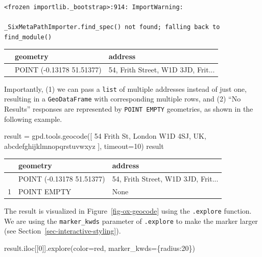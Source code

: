 \documentclass[
  letterpaper,
]{krantz}
\newenvironment{Shaded}{\begin{snugshade}}{\end{snugshade}}
\newcommand{\DecValTok}[1]{\textcolor[rgb]{0.68,0.00,0.00}{#1}}
\newcommand{\NormalTok}[1]{\textcolor[rgb]{0.00,0.23,0.31}{#1}}
\newcommand{\OperatorTok}[1]{\textcolor[rgb]{0.37,0.37,0.37}{#1}}
\newcommand{\StringTok}[1]{\textcolor[rgb]{0.13,0.47,0.30}{#1}}
\begin{document}
\begin{verbatim}
<frozen importlib._bootstrap>:914: ImportWarning:

_SixMetaPathImporter.find_spec() not found; falling back to find_module()
\end{verbatim}

\begin{longtable}[]{@{}lll@{}}
\toprule\noalign{}
& geometry & address \\
\midrule\noalign{}
\endhead
\bottomrule\noalign{}
\endlastfoot
0 & POINT (-0.13178 51.51377) & 54, Frith Street, W1D 3JD, Frit... \\
\end{longtable}

Importantly, (1) we can pass a \texttt{list} of multiple addresses
instead of just one, resulting in a \texttt{GeoDataFrame} with
corresponding multiple rows, and (2) ``No Results'' responses are
represented by \texttt{POINT\ EMPTY} geometries, as shown in the
following example.

\begin{Shaded}
\begin{Highlighting}[]
\NormalTok{result }\OperatorTok{=}\NormalTok{ gpd.tools.geocode([}
    \StringTok{\textquotesingle{}54 Frith St, London W1D 4SJ, UK\textquotesingle{}}\NormalTok{, }
    \StringTok{\textquotesingle{}abcdefghijklmnopqrstuvwxyz\textquotesingle{}}
\NormalTok{], timeout}\OperatorTok{=}\DecValTok{10}\NormalTok{)}
\NormalTok{result}
\end{Highlighting}
\end{Shaded}

\begin{longtable}[]{@{}lll@{}}
\toprule\noalign{}
& geometry & address \\
\midrule\noalign{}
\endhead
\bottomrule\noalign{}
\endlastfoot
0 & POINT (-0.13178 51.51377) & 54, Frith Street, W1D 3JD, Frit... \\
1 & POINT EMPTY & None \\
\end{longtable}

The result is visualized in Figure~\ref{fig-ox-geocode} using the
\texttt{.explore} function. We are using the \texttt{marker\_kwds}
parameter of \texttt{.explore} to make the marker larger (see
Section~\ref{sec-interactive-styling}).

\begin{Shaded}
\begin{Highlighting}[]
\NormalTok{result.iloc[[}\DecValTok{0}\NormalTok{]].explore(color}\OperatorTok{=}\StringTok{\textquotesingle{}red\textquotesingle{}}\NormalTok{, marker\_kwds}\OperatorTok{=}\NormalTok{\{}\StringTok{\textquotesingle{}radius\textquotesingle{}}\NormalTok{:}\DecValTok{20}\NormalTok{\})}
\end{Highlighting}
\end{Shaded}
\end{document}
